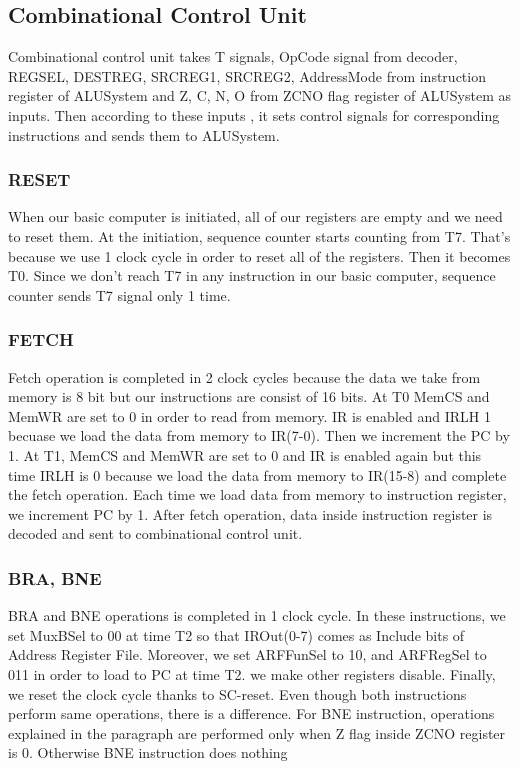 \documentclass[pdftex,12pt,a4paper]{article}
\begin{document}
\subsection{Combinational Control Unit}
Combinational control unit takes T signals, OpCode signal from decoder, REGSEL, DESTREG, SRCREG1, SRCREG2, AddressMode from instruction register of ALUSystem and Z, C, N, O from ZCNO flag register of ALUSystem as inputs. Then according to these inputs , it sets control signals for corresponding instructions and sends them to ALUSystem.   
\subsubsection{RESET}
When our basic computer is initiated, all of our registers are empty and we need to reset them. At the initiation, sequence counter starts counting from T7. That's because we use 1 clock cycle in order to reset all of the registers. Then it becomes T0. Since we don't reach T7 in any instruction in our basic computer, sequence counter sends T7 signal only 1 time.
\subsubsection{FETCH}
Fetch operation is completed in 2 clock cycles because the data we take from memory is 8 bit but our instructions are consist of 16 bits. At T0 MemCS and MemWR are set to 0 in order to read from memory. IR is enabled and IRLH 1 becuase we load the data from memory to IR(7-0). Then we increment the PC by 1. At T1, MemCS and MemWR are set to 0 and IR is enabled again but this time IRLH is 0 because we load the data from memory to IR(15-8) and complete the fetch operation. Each time we load data from memory to instruction register, we increment PC by 1. After fetch operation, data inside instruction register is decoded and sent to combinational control unit.
\subsubsection{BRA, BNE}
BRA and BNE operations is completed in 1 clock cycle. In these instructions, we set MuxBSel to 00 at time T2 so that IROut(0-7) comes as Include bits of Address Register File. Moreover, we set ARFFunSel to 10, and ARFRegSel to 011 in order to load to PC at time T2. we make other registers disable. Finally, we reset the clock cycle thanks to SC-reset. Even though both instructions perform same operations, there is a difference. For BNE instruction, operations explained in the paragraph are performed only when Z flag inside ZCNO register is 0. Otherwise BNE instruction does nothing
\end{document}
